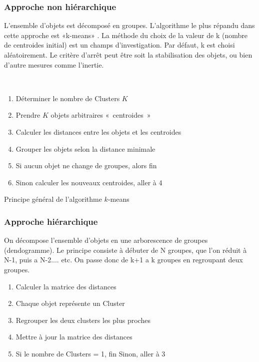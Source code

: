 \documentclass[a4paper,12pt]{report}
\begin{document}
        \subsubsection*{Approche non hiérarchique}

        L'ensemble d'objets est décomposé en groupes. L’algorithme le plus répandu
        dans cette approche est «k-means» . La méthode du choix de la
        valeur de k (nombre de centroides initial) est un champs d’investigation. Par
        défaut, k est choisi aléatoirement. Le critère d’arrêt peut être soit la stabilisation
        des objets, ou bien d’autre mesures comme l’inertie. 

\\
        \begin{enumerate}[leftmargin=*]
            \item Déterminer le nombre de Clusters \( K\)
            \item Prendre \( K \) objets arbitraires «~centroides~»
            \item Calculer les distances entre les objets et les centroides
            \item Grouper les objets selon la distance minimale
            \item Si aucun objet ne change de groupes, alors fin
            \item Sinon calculer les nouveaux centroides, aller à 4
        \end{enumerate}
        
        Principe général de l’algorithme \( k \)-means

        \subsubsection*{Approche hiérarchique}
        On décompose l'ensemble d'objets en une arborescence de groupes
        (dendogramme). Le principe consiste à débuter de N groupes, que l'on réduit à
        N-1, puis a N-2.... etc. On passe donc de k+1 a k groupes en regroupant deux
        groupes. 
        \\
        \begin{enumerate}[leftmargin=*]
            \item Calculer la matrice des distances
            \item Chaque objet représente un Cluster
            \item Regrouper les deux clusters les plus proches
            \item Mettre à jour la matrice des distances
            \item Si le nombre de Clusters = 1, fin Sinon, aller à 3
          \end{enumerate}
        
\end{document}

